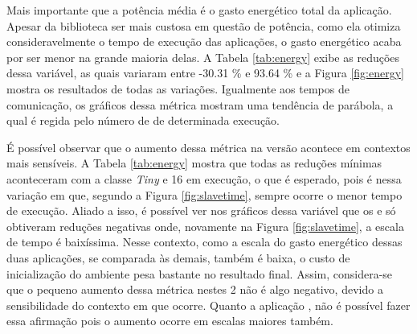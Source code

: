 Mais importante que a potência média é o gasto energético total da aplicação. Apesar da biblioteca \ASYNC ser mais custosa em questão de potência, como ela otimiza consideravelmente o tempo de execução das aplicações, o gasto energético acaba por ser menor na grande maioria delas. A Tabela \ref{tab:energy} exibe as reduções dessa variável, as quais variaram entre -30.31 \% e 93.64 \% e a Figura \ref{fig:energy} mostra os resultados de todas as variações. Igualmente aos tempos de comunicação, os gráficos dessa métrica mostram uma tendência de parábola, a qual é regida pelo número de \clusters de determinada execução.

\begin{table}[h]
\centering
\caption{Reduções ao comparar-se o gasto energético total.}
\label{tab:energy}
\end{table}

É possível observar que o aumento dessa métrica na versão \ASYNC acontece em contextos mais sensíveis. A Tabela \ref{tab:energy} mostra que todas as reduções mínimas aconteceram com a classe \textit{Tiny} e 16 \clusters em execução, o que é esperado, pois é nessa variação em que, segundo a Figura \ref{fig:slavetime}, sempre ocorre o menor tempo de execução. Aliado a isso, é possível ver nos gráficos dessa variável que os  \FAST e \GF só obtiveram reduções negativas onde, novamente na Figura \ref{fig:slavetime}, a escala de tempo é baixíssima. Nesse contexto, como a escala do gasto energético dessas duas aplicações, se comparada às demais, também é baixa, o custo de inicialização do ambiente \ASYNC pesa bastante no resultado final. Assim, considera-se que o pequeno aumento dessa métrica nestes 2  não é algo negativo, devido a sensibilidade do contexto em que ocorre. Quanto a aplicação \IS, não é possível fazer essa afirmação pois o aumento ocorre em escalas maiores também.

